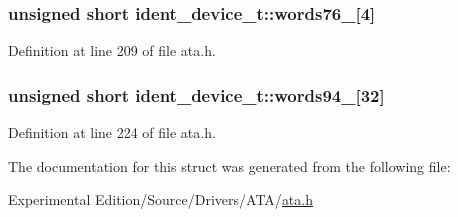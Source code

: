 \subsubsection[{\texorpdfstring{words76\+\_\+79}{words76_79}}]{\setlength{\rightskip}{0pt plus 5cm}unsigned short ident\+\_\+device\+\_\+t\+::words76\+\_\mbox{[}4\mbox{]}}\hypertarget{structident__device__t_a49b7f672d60d273ea4c6b12b45677bab}{}\label{structident__device__t_a49b7f672d60d273ea4c6b12b45677bab}


Definition at line 209 of file ata.\+h.

\subsubsection[{\texorpdfstring{words94\+\_\+125}{words94_125}}]{\setlength{\rightskip}{0pt plus 5cm}unsigned short ident\+\_\+device\+\_\+t\+::words94\+\_\mbox{[}32\mbox{]}}\hypertarget{structident__device__t_a32485bac63213d7c0780a89df8b066e3}{}\label{structident__device__t_a32485bac63213d7c0780a89df8b066e3}


Definition at line 224 of file ata.\+h.



The documentation for this struct was generated from the following file\+:\begin{DoxyCompactItemize}
\item 
Experimental Edition/\+Source/\+Drivers/\+A\+T\+A/\hyperlink{ata_8h}{ata.\+h}\end{DoxyCompactItemize}

